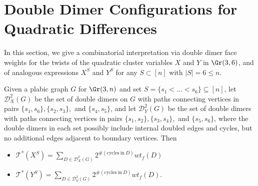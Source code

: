\section{Double Dimer Configurations for Quadratic Differences}\label{section:doubledimers}
In this section, we give a combinatorial interpretation via double dimer face weights for the twists of the quadratic cluster variables $X$ and $Y$ in $\Gr(3,6)$, and of analogous expressions $X^S$ and $Y^S$ for any $S \subset [n]$ with $|S|=6 \leq n$.


\begin{theorem}\label{theorem:doubledimersXY}
Given a plabic graph $G$ for $\Gr(3,n)$ and set $S=\{s_1<\dots<s_6\} \subseteq [n]$, let $\mathcal{D}^2_X(G)$ be the set of double dimers on $G$ with paths connecting vertices in pairs $\{s_1,s_6\},\{s_2,s_3\},$ and $\{s_4,s_5\}$, and let $\mathcal{D}^2_Y(G)$ be the set of double dimers with paths connecting vertices in pairs $\{s_1,s_2\},\{s_3,s_4\},$ and $\{s_5,s_6\}$, where the double dimers in each set possibly include internal doubled edges and cycles, but no additional edges adjacent to boundary vertices. Then
\begin{itemize}
    \item $\mathcal{T}^*(X^S)=\sum_{D \in \mathcal{D}^2_X(G)} 2^{\#( \mathrm{cycles~in~}D)} wt_f(D)$
    \item $\mathcal{T}^*(Y^S)=\sum_{D \in \mathcal{D}^2_Y(G)} 2^{\#( \mathrm{cycles~in~}D)} wt_f(D).$
\end{itemize}
\end{theorem}
